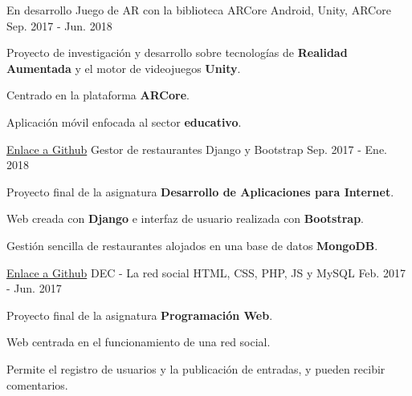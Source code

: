 

\begin{cventries}

  \cventry
    {{En desarrollo}} %
    {Juego de AR con la biblioteca ARCore} %
    {Android, Unity, ARCore} %
    {Sep. 2017 - Jun. 2018} %
    {
      \begin{cvitems} %
        \item {Proyecto de investigación y desarrollo sobre tecnologías de \textbf{Realidad Aumentada} y el motor de videojuegos \textbf{Unity}.}
        \item {Centrado en la plataforma \textbf{ARCore}.}
        \item {Aplicación móvil enfocada al sector \textbf{educativo}.}
      \end{cvitems}
    }

  \cventry
    {\href{https://github.com/matl1995/DAI}{Enlace a Github}} %
    {Gestor de restaurantes} %
    {Django y Bootstrap} %
    {Sep. 2017 - Ene. 2018} %
    {
      \begin{cvitems} %
        \item {Proyecto final de la asignatura \textbf{Desarrollo de Aplicaciones para Internet}.}
        \item {Web creada con \textbf{Django} e interfaz de usuario realizada con \textbf{Bootstrap}.}
        \item {Gestión sencilla de restaurantes alojados en una base de datos \textbf{MongoDB}.}
      \end{cvitems}
    }

  \cventry
    {\href{https://github.com/matl1995/PW}{Enlace a Github}} %
    {DEC - La red social} %
    {HTML, CSS, PHP, JS y MySQL} %
    {Feb. 2017 - Jun. 2017} %
    {
      \begin{cvitems} %
        \item {Proyecto final de la asignatura \textbf{Programación Web}.}
        \item {Web centrada en el funcionamiento de una red social.}
        \item {Permite el registro de usuarios y la publicación de entradas, y pueden recibir comentarios.}
      \end{cvitems}
    }


\end{cventries}
